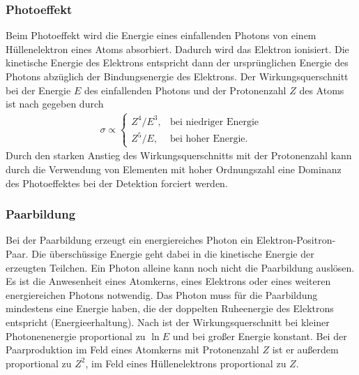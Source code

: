 \subsubsection*{Photoeffekt}
Beim Photoeffekt wird die Energie eines einfallenden Photons von einem Hüllenelektron eines Atoms absorbiert. Dadurch wird das Elektron ionisiert. Die kinetische Energie des Elektrons entspricht dann der ursprünglichen Energie des Photons abzüglich der Bindungsenergie des Elektrons. Der Wirkungsquerschnitt bei der Energie $E$ des einfallenden Photons und der Protonenzahl $Z$ des Atoms ist nach \cite{wirkungsquerschnitt} gegeben durch
\begin{align*}
  \sigma \propto \begin{cases}
    Z^4/E^3, & \text{bei niedriger Energie}\\
    Z^5/E, & \text{bei hoher Energie}.
  \end{cases}
\end{align*}
Durch den starken Anstieg des Wirkungsquerschnitts mit der Protonenzahl kann durch die Verwendung von Elementen mit hoher Ordnungszahl eine Dominanz des Photoeffektes bei der Detektion forciert werden.

\subsubsection*{Paarbildung}
Bei der Paarbildung erzeugt ein energiereiches Photon ein Elektron-Positron-Paar. Die überschüssige Energie geht dabei in die kinetische Energie der erzeugten Teilchen. Ein Photon alleine kann noch nicht die Paarbildung auslösen. Es ist die Anwesenheit eines Atomkerns, eines Elektrons oder eines weiteren energiereichen Photons notwendig. Das Photon muss für die Paarbildung mindestens eine Energie haben, die der doppelten Ruheenergie des Elektrons entspricht (Energieerhaltung). Nach \cite{wirkungsquerschnitt} ist der Wirkungsquerschnitt bei kleiner Photonenenergie proportional zu $\ln E$ und bei großer Energie konstant. Bei der Paarproduktion im Feld eines Atomkerns mit Protonenzahl $Z$ ist er außerdem proportional zu $Z^2$, im Feld eines Hüllenelektrons proportional zu $Z$.

